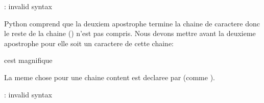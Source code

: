 \documentclass[letterpaper,10pt,french]{sphinxmanual}
\begin{document}
\begin{sphinxVerbatim}[commandchars=\\\{\}]
     
: invalid syntax
\end{sphinxVerbatim}

\sphinxAtStartPar
Python comprend que la deuxiem apostrophe termine la chaine de caractere donc le reste de la chaine () n’est pas compris. Nous devons mettre \sphinxcode{\sphinxupquote{\textbackslash{}}} avant la deuxieme apostrophe pour elle soit un caractere de cette chaine:

\begin{sphinxVerbatim}[commandchars=\\\{\}]
\end{sphinxVerbatim}

\begin{sphinxVerbatim}[commandchars=\\\{\}]
c\PYGZsq{}est magnifique
\end{sphinxVerbatim}

\sphinxAtStartPar
La meme chose pour une chaine content  est declaree par  (comme ).

\begin{sphinxVerbatim}[commandchars=\\\{\}]
\end{sphinxVerbatim}

\begin{sphinxVerbatim}[commandchars=\\\{\}]
: invalid syntax
\end{sphinxVerbatim}
\end{document}
